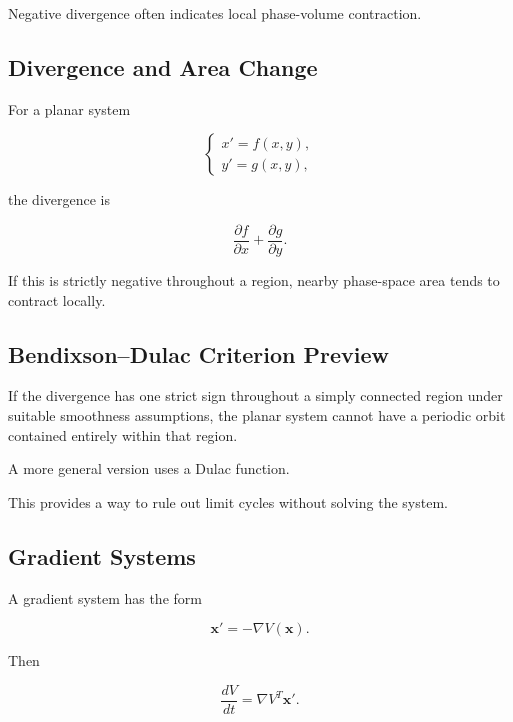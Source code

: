 Negative divergence often indicates local phase-volume contraction.

\subsection{Divergence and Area Change}
\label{subsec:divergence-area-change}

For a planar system

\[
\begin{cases}
x'=f(x,y),\\
y'=g(x,y),
\end{cases}
\]

the divergence is

\[
\boxed{
\frac{\partial f}{\partial x}
+
\frac{\partial g}{\partial y}.
}
\]

If this is strictly negative throughout a region, nearby phase-space area
tends to contract locally.

\subsection{Bendixson--Dulac Criterion Preview}
\label{subsec:bendixson-dulac-preview}

If the divergence has one strict sign throughout a simply connected
region under suitable smoothness assumptions, the planar system cannot
have a periodic orbit contained entirely within that region.

A more general version uses a Dulac function.

This provides a way to rule out limit cycles without solving the system.

\subsection{Gradient Systems}
\label{subsec:gradient-systems}

A gradient system has the form

\[
\boxed{
\mathbf{x}'
=
-\nabla V(\mathbf{x}).
}
\]

Then

\[
\frac{dV}{dt}
=
\nabla V^T
\mathbf{x}'.
\]

